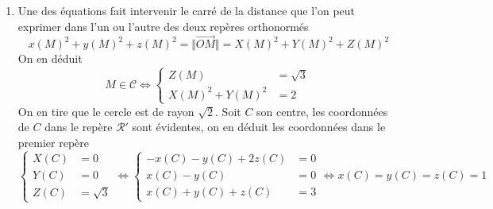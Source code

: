 \begin{enumerate}
 \item Une des équations fait intervenir le carré de la distance que l'on peut exprimer dans l'un ou l'autre des deux repères orthonormés
\begin{displaymath}
 x(M)^2+y(M)^2+z(M)^2
= \Vert \overrightarrow{OM}\Vert
= X(M)^2+Y(M)^2+Z(M)^2
\end{displaymath}
On en déduit 
\begin{displaymath}
 M\in \mathcal{C}\Leftrightarrow
\left\lbrace
\begin{aligned}
 Z(M) &= \sqrt{3} \\
 X(M)^2 + Y(M)^2 &= 2
\end{aligned}
\right. 
\end{displaymath}
On en tire que le cercle est de rayon $\sqrt{2}$. Soit $C$ son centre, les coordonnées de $C$ dans le repère $\mathcal{R}'$ sont évidentes, on en déduit les coordonnées dans le premier repère
\begin{displaymath}
 \left\lbrace 
\begin{aligned}
 X(C) &= 0\\
 Y(C) &= 0\\
 Z(C) &= \sqrt{3}
\end{aligned}
\right. 
\Leftrightarrow
 \left\lbrace 
\begin{aligned}
 -x(C)-y(C) +2z(C)&= 0\\
 x(C)-y(C) &= 0\\
 x(C)+y(C)+z(C) &= 3
\end{aligned}
\right. 
\Leftrightarrow
x(C)=y(C)=z(C)=1
\end{displaymath}

\end{enumerate}

